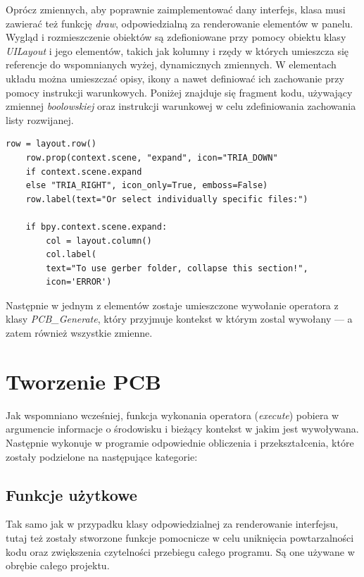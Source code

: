 \documentclass{xmgr}
\begin{document}
Oprócz zmiennych, aby poprawnie zaimplementować dany interfejs, klasa musi zawierać też funkcję \emph{draw}, odpowiedzialną za renderowanie elementów w panelu. Wygląd i rozmieszczenie obiektów są zdefioniowane przy pomocy obiektu klasy \emph{UILayout} i jego elementów, takich jak kolumny i rzędy w których umieszcza się referencje do wspomnianych wyżej, dynamicznych zmiennych. 
W elementach układu można umieszczać opisy, ikony a nawet definiować ich zachowanie przy pomocy instrukcji warunkowych. Poniżej znajduje się fragment kodu, używający zmiennej \emph{boolowskiej} oraz instrukcji warunkowej w celu zdefiniowania zachowania listy rozwijanej.

\begin{lstlisting}
row = layout.row()
	row.prop(context.scene, "expand", icon="TRIA_DOWN"
	if context.scene.expand
	else "TRIA_RIGHT", icon_only=True, emboss=False)
	row.label(text="Or select individually specific files:")

	if bpy.context.scene.expand:
		col = layout.column()
		col.label(
		text="To use gerber folder, collapse this section!",
		icon='ERROR')
\end{lstlisting}

Następnie w jednym z elementów zostaje umieszczone wywołanie operatora z klasy \emph{PCB\_Generate}, który przyjmuje kontekst w którym zostal wywołany --- a zatem również wszystkie zmienne.

\section {Tworzenie PCB}
Jak wspomniano wcześniej, funkcja wykonania operatora (\emph{execute}) pobiera w argumencie informacje o środowisku i bieżący kontekst w jakim jest wywoływana. Następnie wykonuje w programie odpowiednie obliczenia i przekształcenia, które zostały podzielone na następujące kategorie:
\subsection{Funkcje użytkowe}
Tak samo jak w przypadku klasy odpowiedzialnej za renderowanie interfejsu, tutaj też zostały stworzone funkcje pomocnicze w celu uniknięcia powtarzalności kodu oraz zwiększenia czytelności przebiegu całego programu. Są one używane w obrębie całego projektu.
\end{document}
